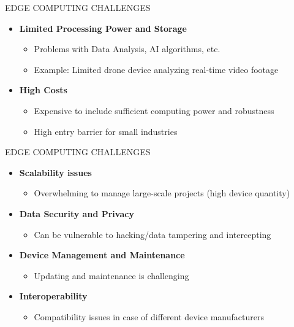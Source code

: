 \documentclass[aspectratio=169,xcolor=dvipsnames]{beamer}
\begin{document}
\begin{frame}{EDGE COMPUTING CHALLENGES}
    \begin{itemize}
        \item \textbf{Limited Processing Power and Storage}
        \begin{itemize}
            \item Problems with Data Analysis, AI algorithms, etc.
            \item Example: Limited drone device analyzing real-time video footage
        \end{itemize}
         \item \textbf{High Costs}
         \begin{itemize}
            \item Expensive to include sufficient computing power and robustness
            \item High entry barrier for small industries
        \end{itemize}
    \end{itemize}
\end{frame}
\begin{frame}{EDGE COMPUTING CHALLENGES}
    \begin{itemize}
        \item \textbf{Scalability issues}
        \begin{itemize}
            \item Overwhelming to manage large-scale projects (high device quantity)
        \end{itemize}
         \item \textbf{Data Security and Privacy}
         \begin{itemize}
            \item Can be vulnerable to hacking/data tampering and intercepting
        \end{itemize}
        \item \textbf{Device Management and Maintenance}
        \begin{itemize}
            \item Updating and maintenance is challenging
        \end{itemize}
         \item \textbf{Interoperability}
         \begin{itemize}
            \item Compatibility issues in case of different device manufacturers
        \end{itemize}
    \end{itemize}
\end{frame}
\end{document}
